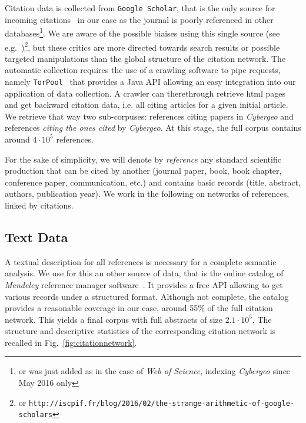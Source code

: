 Citation data is collected from \texttt{Google Scholar}, that is the only source for incoming citations~\citep{noruzi2005google} in our case as the journal is poorly referenced in other databases\footnote{or was just added as in the case of \textit{Web of Science}, indexing \textit{Cybergeo} since May 2016 only}. We are aware of the possible biaises using this single source (see e.g.~\cite{bohannon2014scientific})\footnote{or \texttt{http://iscpif.fr/blog/2016/02/the-strange-arithmetic-of-google-scholars}}, but these critics are more directed towards search results or possible targeted manipulations than the global structure of the citation network. The automatic collection requires the use of a crawling software to pipe requests, namely \texttt{TorPool}~\citep{torpool} that provides a Java API allowing an easy integration into our application of data collection. A crawler can therethrough retrieve html pages and get backward citation data, i.e. all citing articles for a given initial article. We retrieve that way two sub-corpuses: references citing papers in \textit{Cybergeo} and references \emph{citing the ones cited} by \textit{Cybergeo}. At this stage, the full corpus contains around $4\cdot10^5$ references.


For the sake of simplicity, we will denote by \emph{reference} any standard scientific production that can be cited by another (journal paper, book, book chapter, conference paper, communication, etc.) and contains basic records (title, abstract, authors, publication year). We work in the following on networks of references, linked by citations.



\subsection*{Text Data}

A textual description for all references is necessary for a complete semantic analysis. We use for this an other source of data, that is the online catalog of \textit{Mendeley} reference manager software~\cite{mendeley}. It provides a free API allowing to get various records under a structured format. Although not complete, the catalog provides a reasonable coverage in our case, around 55\% of the full citation network. This yields a final corpus with full abstracts of size $2.1\cdot 10^5$. The structure and descriptive statistics of the corresponding citation network is recalled in Fig.~\ref{fig:citationnetwork}.


